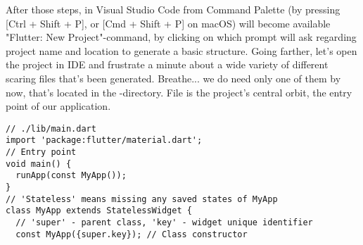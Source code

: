 After those steps, in Visual Studio Code from Command Palette (by pressing [Ctrl + Shift + P], or [Cmd + Shift + P] 
on macOS) will become available "Flutter: New Project"-command, by clicking on which prompt will ask regarding project 
name and location to generate a basic structure. Going farther, let's open the project in IDE and frustrate a minute 
about a wide variety of different scaring files that's been generated. Breathe... we do need only one of them by 
now, that's located in the -directory. File  is the project's central orbit, the entry point of our 
application.

\begin{lstlisting}
// ./lib/main.dart
import 'package:flutter/material.dart';
// Entry point
void main() {
  runApp(const MyApp());
}
// 'Stateless' means missing any saved states of MyApp
class MyApp extends StatelessWidget {
  // 'super' - parent class, 'key' - widget unique identifier
  const MyApp({super.key}); // Class constructor
  

\end{lstlisting}
